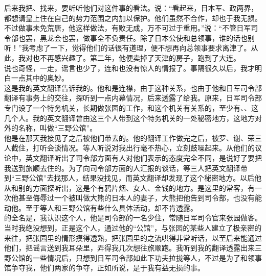 后来我把、找来，要听听他们对这件事的看法。说：“看起来，日本军、政两界，都想请皇上住在自己的势力范围之内加以保护。他们虽然不合作，却也于我无损。不过做事未免荒唐，他这样做法，有败无成，万不可过于重用。”说：“不管日军司令部也罢，黑龙会也罢，做事全不负责任。除了日本公使和总领事，谁的话也别听！”我考虑了一下，觉得他们的话很有道理，便不想再向总领事要求离津了。从此，我对也不再感兴趣了。第二年，他便卖掉了天津的房子，跑到了大连。\\

说也奇怪，一走，谣言也少了，连和也没有惊人的情报了。事隔很久以后，我才明白一点其中的奥妙。\\

这是我的英文翻译告诉我的。他和是连襟，由于这种关系，也由于他和日军司令部翻译有事务上的交往，探听到一点内幕情况，后来透露了给我。原来，日军司令部专门设了一个特务机关，长期做张园的工作，和这个机关有关系的，至少有、、这几个人。我的英文翻译曾由这三个人带到这个特务机关的一处秘密地方，这地方对外的名称，叫做“三野公馆”。\\

他是在那天我接见了之后被他们带去的。他的翻译工作做完之后，被罗、谢、荣三人截住，打听会谈情况。等人听说对我出行毫不热心，立刻鼓噪起来。从他们的议论中，英文翻译听出了司令部方面有人对他们表示的态度完全不同，是说好了要把我送到旅顺去住的。为了向司令部方面的人汇报的谈话，等三人把英文翻译带到“三野公馆”去找那人，结果没找见，而英文翻译却发现了这个秘密地方。以后他从和别的方面探听出，这是个有鸦片烟、女人、金钱的地方。是这里的常客，有一次他甚至侮辱过一个被叫做大熊的日本人的妻子，大熊把他告到司令部，也没有能动他。至于等人和三野公馆有些什么具体活动，却不肯透露。\\

的全名是，我认识这个人，他是司令部的一名少住，常随日军司令官来张园做客。当时我绝没想到，正是这个人，通过他的“公馆”，与张园的某些人建立了极亲密的来往，把张园里的情形摸得透熟，把张园里的之流哄得非常听话，以至后来能通过他们，把谣言送到我耳朵里，弄得我几次想往旅顺跑。我听到我的翻译透露出来三野公馆的一些情况后，只想到日军司令部如此下功夫拉拢等人，不过是为了和领事馆争夺我，他们两家的争夺，正如所说，是于我有益无损的事。\\

